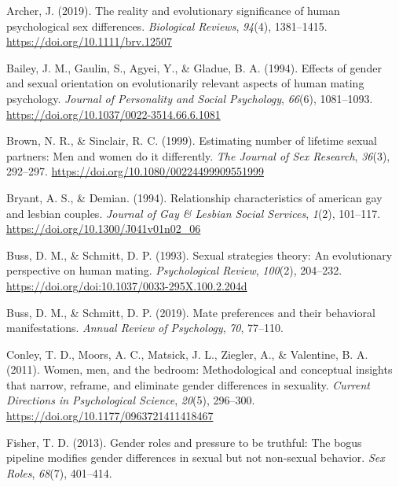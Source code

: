 \documentclass[
  12pt,
]{article}
\newlength{\cslhangindent}
\newlength{\cslentryspacingunit} %
\newenvironment{CSLReferences}[2] %
 {%
  \setlength{\parindent}{0pt}
  \ifodd #1
  \let\oldpar\par
  \def\par{\hangindent=\cslhangindent\oldpar}
  \fi
  \setlength{\parskip}{#2\cslentryspacingunit}
 }%
 {}
\begin{document}
\hypertarget{refs}{}
\begin{CSLReferences}{1}{0}
\leavevmode{}%
Archer, J. (2019). The reality and evolutionary significance of human
psychological sex differences. \emph{Biological Reviews}, \emph{94}(4),
1381--1415. \url{https://doi.org/10.1111/brv.12507}

\leavevmode{}%
Bailey, J. M., Gaulin, S., Agyei, Y., \& Gladue, B. A. (1994). Effects
of gender and sexual orientation on evolutionarily relevant aspects of
human mating psychology. \emph{Journal of Personality and Social
Psychology}, \emph{66}(6), 1081--1093.
\url{https://doi.org/10.1037/0022-3514.66.6.1081}

\leavevmode{}%
Brown, N. R., \& Sinclair, R. C. (1999). Estimating number of lifetime
sexual partners: Men and women do it differently. \emph{The Journal of
Sex Research}, \emph{36}(3), 292--297.
\url{https://doi.org/10.1080/00224499909551999}

\leavevmode{}%
Bryant, A. S., \& Demian. (1994). Relationship characteristics of
american gay and lesbian couples. \emph{Journal of Gay \& Lesbian Social
Services}, \emph{1}(2), 101--117.
\url{https://doi.org/10.1300/J041v01n02_06}

\leavevmode{}%
Buss, D. M., \& Schmitt, D. P. (1993). Sexual strategies theory: An
evolutionary perspective on human mating. \emph{Psychological Review},
\emph{100}(2), 204--232.
\url{https://doi.org/doi:10.1037/0033-295X.100.2.204d}

\leavevmode{}%
Buss, D. M., \& Schmitt, D. P. (2019). Mate preferences and their
behavioral manifestations. \emph{Annual Review of Psychology},
\emph{70}, 77--110.

\leavevmode{}%
Conley, T. D., Moors, A. C., Matsick, J. L., Ziegler, A., \& Valentine,
B. A. (2011). Women, men, and the bedroom: Methodological and conceptual
insights that narrow, reframe, and eliminate gender differences in
sexuality. \emph{Current Directions in Psychological Science},
\emph{20}(5), 296--300. \url{https://doi.org/10.1177/0963721411418467}

\leavevmode{}%
Fisher, T. D. (2013). Gender roles and pressure to be truthful: The
bogus pipeline modifies gender differences in sexual but not non-sexual
behavior. \emph{Sex Roles}, \emph{68}(7), 401--414.


\end{CSLReferences}
\end{document}
